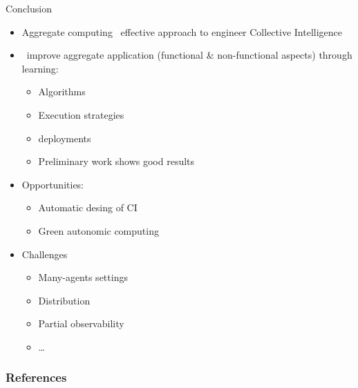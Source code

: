 \documentclass[8pt, aspectratio=169, handout]{beamer}
\begin{document}
\begin{frame}{Conclusion}
  \begin{card}[Recap]
    \begin{itemize}
      \item Aggregate computing \faArrowRight \, effective approach to engineer Collective Intelligence
      \item {} \faArrowRight \, improve aggregate application (functional \& non-functional aspects) through learning:
      \begin{itemize}
        \item Algorithms
        \item Execution strategies
        \item deployments
        \item[\success{\faThumbsUp}] Preliminary work shows good results
      \end{itemize}
      \item Opportunities:
      \begin{itemize}
        \item Automatic desing of CI~\cite{szuba2001formal}
        \item Green autonomic computing
      \end{itemize}
      \item Challenges
      \begin{itemize}
        \item Many-agents settings
        \item Distribution
        \item Partial observability
        \item \dots
      \end{itemize}
    \end{itemize}
    
  \end{card}
\end{frame}
\begin{frame}[allowframebreaks]
  \frametitle{References}
  \printbibliography
\end{frame}
\end{document}
